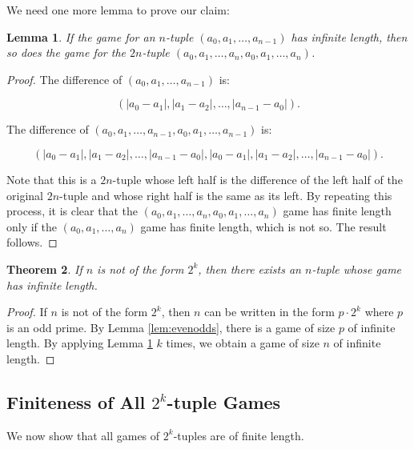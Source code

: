 \documentclass[12pt]{amsart}
\newtheorem{theorem}{Theorem}[section]
\newtheorem{lemma}[theorem]{Lemma}
\newcommand{\breathe}{\vspace{0.2cm}}
\begin{document}
We need one more lemma to prove our claim:

\begin{lemma}
\label{lem:doubles}
If the game for an $n$-tuple $(a_0, a_1, \ldots, a_{n-1})$ has infinite length, then so does the game for the $2n$-tuple $(a_0, a_1, \ldots, a_n, a_0, a_1, \ldots, a_n)$.
\end{lemma}

\begin{proof}

The difference of $(a_0, a_1, \ldots, a_{n-1})$ is:

$$(|a_0 - a_1|, |a_1 - a_2|, \ldots, |a_{n-1} - a_0|).$$

\breathe

The difference of $(a_0, a_1, \ldots, a_{n-1}, a_0, a_1, \ldots, a_{n-1})$ is:

$$(|a_0 - a_1|, |a_1 - a_2|, \ldots, |a_{n-1} - a_0|, |a_0 - a_1|, |a_1 - a_2|, \ldots, |a_{n-1} - a_0|).$$

Note that this is a $2n$-tuple whose left half is the difference of the left half of the original $2n$-tuple and whose right half is the same as its left. By repeating this process, it is clear that the $(a_0, a_1, \ldots, a_n, a_0, a_1, \ldots, a_n)$ game has finite length only if the $(a_0, a_1, \ldots, a_n)$ game has finite length, which is not so. The result follows.

\end{proof}

\begin{theorem}
\label{theorem:notPowersOfTwo}
If $n$ is not of the form $2^k$, then there exists an $n$-tuple whose game has infinite length.
\end{theorem}

\begin{proof}

If $n$ is not of the form $2^k$, then $n$ can be written in the form $p \cdot 2^k$ where $p$ is an odd prime. By Lemma \ref{lem:evenodds}, there is a game of size $p$ of infinite length. By applying Lemma \ref{lem:doubles} $k$ times, we obtain a game of size $n$ of infinite length. 
\end{proof}

\subsection{Finiteness of All $2^k$-tuple Games}

We now show that all games of $2^k$-tuples are of finite length.
\end{document}
